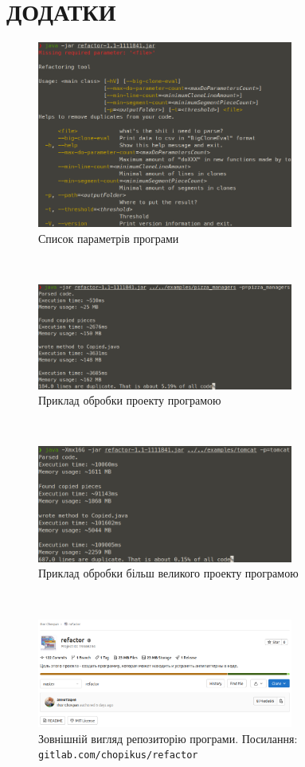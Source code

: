 \documentclass[a4paper, 14pt]{article}
\begin{document}
\section*{\textbf{ДОДАТКИ}}
\setcounter{figure}{0}    
\begin{figure}[h]
    \centering
    \includegraphics[width=0.75\textwidth]{add1}
    \caption{\centering Список параметрів програми}
\end{figure} \hfill \\
\begin{figure}[h]
    \centering
    \includegraphics[width=0.75\textwidth]{add2}
    \caption{\centering Приклад обробки проекту програмою}
\end{figure} \hfill \\
\begin{figure}[h]
    \centering
    \includegraphics[width=0.75\textwidth]{add3}
    \caption{\centering Приклад обробки більш великого проекту програмою}
\end{figure} \hfill \\
\begin{figure}[h]
    \centering
    \includegraphics[width=0.75\textwidth]{add-gitlab}
    \caption{\centering Зовнішній вигляд репозиторію програми. \protect\linebreak Посилання: \texttt{gitlab.com/chopikus/refactor} }
\end{figure} \hfill \\
\end{document}
